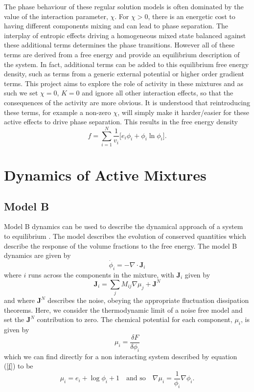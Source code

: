 The phase behaviour of these regular solution models is often dominated by the value of the interaction parameter, $\chi$. For $\chi > 0 $, there is an energetic cost to having different components mixing and can lead to phase separation. The interplay of entropic effects driving a homogeneous mixed state balanced against these additional terms determines the phase transitions. However all of these terms are derived from a free energy and provide an equilibrium description of the system. In fact, additional terms can be added to this equilibrium free energy density, such as terms from a generic external potential or higher order gradient terms. This project aims to explore the role of activity in these mixtures and as such we set $\chi = 0$, $K = 0$ and ignore all other interaction effects, so that the consequences of the activity are more obvious. It is understood that reintroducing these terms, for example a non-zero $\chi$, will simply make it harder/easier for these active effects to drive phase separation. This results in the free energy density
\begin{equation}
    f = \sum_{i=1}^{N}\frac{1}{v_i}\Bigg[e_i\phi_i + \phi_i\ln\phi_i\Bigg].
    \label{f}
\end{equation}

\section{Dynamics of Active Mixtures}

\subsection{Model B}
Model B dynamics can be used to describe the dynamical approach of a system to equilibrium \cite{li_non-equilibrium_2020}. The model describes the evolution of conserved quantities which describe the response of the volume fractions to the free energy. The model B dynamics are given by \cite{cates_active_2019}
\begin{equation}
    \dot{\phi}_i = - \nabla \cdot \textbf{J}_i
    \label{modB1}
\end{equation}
where $i$ runs across the components in the mixture, with $\textbf{J}_i$ given by
\begin{equation}
    \textbf{J}_i = \sum_j M_{ij}\nabla\mu_j + \textbf{J}^N
    \label{modB2}
\end{equation}
and where $\textbf{J}^N$ describes the noise, obeying the appropriate fluctuation dissipation theorems. Here, we consider the thermodynamic limit of a noise free model and set the $ \textbf{J}^N$ contribution to zero. The chemical potential for each component, $\mu_i$, is given by
\begin{equation}
    \mu_i = \frac{\delta F}{\delta \phi_i}
\end{equation}
which we can find directly for a non interacting system described by equation (\ref{f}) to be
\begin{equation}
    \mu_i = e_i + \log\phi_i + 1 \quad \text{and so} \quad \nabla\mu_i = \frac{1}{\phi_i}\nabla\phi_i.
    \label{chempots}
\end{equation}

